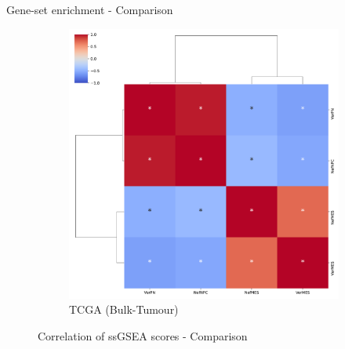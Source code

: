 \documentclass[aspectratio=169,9pt]{beamer}
\begin{document}
\begin{frame}{Gene-set enrichment - Comparison}
\begin{adjustwidth}{-5cm}{-5cm}
\begin{figure}
\begin{subfigure}[c]{0.48\textwidth}
                    \includegraphics[width=\textwidth]{GSEA_TCGA_corrplot_2D}
                    \caption{TCGA (Bulk-Tumour)}
                \end{subfigure}
                \caption{Correlation of ssGSEA scores - Comparison}
            \end{figure}
        \end{adjustwidth}
    \end{frame}
\end{document}
